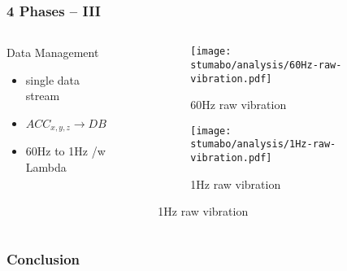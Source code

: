 \begin{frame}
    \frametitle{4 Phases -- III}
    \vspace*{\fill}
    \begin{columns}[onlytextwidth, c]
        \begin{column}{.47\textwidth}
            \begin{exampleblock}{Data Management}
                \begin{itemize}
                    \item single data stream
                    \item  $ ACC_{x, y, z} \longrightarrow DB$ 
                    \item 60Hz to 1Hz /w Lambda
                \end{itemize}
            \end{exampleblock}
        \end{column}
        \begin{column}{.52\textwidth}
            \begin{figure}[ht]
                \begin{subfigure}{\textwidth}
                    \centering
                    \texttt{[image: stumabo/analysis/60Hz-raw-vibration.pdf]}
                    \caption{60Hz raw vibration}
                    \label{fig:stu_60Hz_raw}
                \end{subfigure}
                \begin{subfigure}{\textwidth}
                    \centering
                    \texttt{[image: stumabo/analysis/1Hz-raw-vibration.pdf]}
                    \caption{1Hz raw vibration}
                    \label{fig:stu_1Hz_raw}
                \end{subfigure}
            \end{figure}
        \end{column}
    \end{columns}
    \vspace*{\fill}
\end{frame}



\begin{frame}
    \frametitle{Conclusion}
    \vspace*{\fill}

    \vspace*{\fill}
\end{frame}